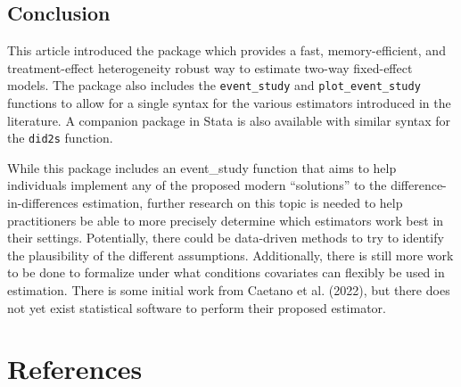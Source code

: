 \hypertarget{conclusion}{%
\subsection{Conclusion}\label{conclusion}}

This article introduced the package  which provides a fast, memory-efficient, and treatment-effect heterogeneity robust way to estimate two-way fixed-effect models. The package also includes the \texttt{event\_study} and \texttt{plot\_event\_study} functions to allow for a single syntax for the various estimators introduced in the literature. A companion package in Stata is also available with similar syntax for the \texttt{did2s} function.

While this package includes an event\_study function that aims to help individuals implement any of the proposed modern ``solutions'' to the difference-in-differences estimation, further research on this topic is needed to help practitioners be able to more precisely determine which estimators work best in their settings. Potentially, there could be data-driven methods to try to identify the plausibility of the different assumptions. Additionally, there is still more work to be done to formalize under what conditions covariates can flexibly be used in estimation. There is some initial work from Caetano et al. (2022), but there does not yet exist statistical software to perform their proposed estimator.

\hypertarget{references}{%
\section*{References}\label{references}}

